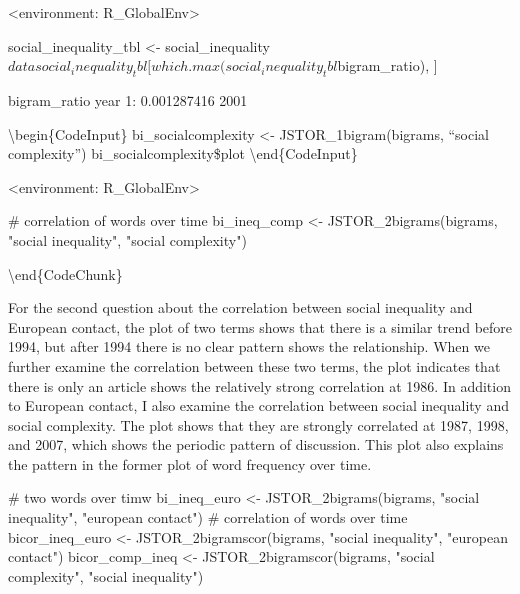\documentclass[10pt]{article}
\newenvironment{CodeChunk}{}{}
\begin{document}
\begin{CodeChunk}
\begin{CodeOutput}
<environment: R_GlobalEnv>
\end{CodeOutput}\begin{CodeInput}
social_inequality_tbl <- social_inequality$data
social_inequality_tbl[which.max(social_inequality_tbl$bigram_ratio), ]
\end{CodeInput}\begin{CodeOutput}
   bigram_ratio year
1:  0.001287416 2001
\end{CodeOutput}

\textbackslash{}begin\{CodeInput\} bi\_socialcomplexity \textless{}-
JSTOR\_1bigram(bigrams, ``social complexity'')
bi\_socialcomplexity\$plot \textbackslash{}end\{CodeInput\}

\begin{CodeOutput}
<environment: R_GlobalEnv>
\end{CodeOutput}\begin{CodeInput}
# correlation of words over time
bi_ineq_comp <- JSTOR_2bigrams(bigrams, "social inequality", "social complexity")
\end{CodeInput}

\textbackslash{}end\{CodeChunk\}

For the second question about the correlation between social inequality
and European contact, the plot of two terms shows that there is a
similar trend before 1994, but after 1994 there is no clear pattern
shows the relationship. When we further examine the correlation between
these two terms, the plot indicates that there is only an article shows
the relatively strong correlation at 1986. In addition to European
contact, I also examine the correlation between social inequality and
social complexity. The plot shows that they are strongly correlated at
1987, 1998, and 2007, which shows the periodic pattern of discussion.
This plot also explains the pattern in the former plot of word frequency
over time.

\begin{CodeChunk}
\begin{CodeInput}
# two words over timw
bi_ineq_euro <- JSTOR_2bigrams(bigrams, "social inequality", "european contact")
# correlation of words over time
bicor_ineq_euro <- JSTOR_2bigramscor(bigrams, "social inequality", "european contact")
bicor_comp_ineq <- JSTOR_2bigramscor(bigrams, "social complexity", "social inequality")
\end{CodeInput}
\end{CodeChunk}


\end{CodeChunk}
\end{document}
